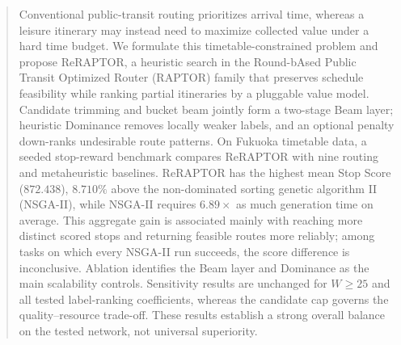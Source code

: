 \author{Bin Zhou \and
    Guangxian Li \and
    Teruki Ogo \and
    Yutaka Arakawa \and
    Tsunenori Mine %
}



\date{Received: date / Accepted: date}


\maketitle

\begin{abstract}
    Conventional public-transit routing prioritizes arrival time, whereas a
    leisure itinerary may instead need to maximize collected value under a hard
    time budget. We formulate this timetable-constrained problem and propose
    ReRAPTOR, a heuristic search in the Round-bAsed Public Transit Optimized
    Router (RAPTOR) family that preserves schedule
    feasibility while ranking partial itineraries by a pluggable value model.
    Candidate trimming and bucket beam jointly form a two-stage Beam layer;
    heuristic Dominance removes locally weaker labels, and an optional penalty
    down-ranks undesirable route patterns. On Fukuoka timetable data, a seeded
    stop-reward benchmark
    compares ReRAPTOR with nine routing and metaheuristic baselines. ReRAPTOR has
    the highest mean Stop Score (\(872.438\)), \(8.710\%\) above the
    non-dominated sorting genetic algorithm II (NSGA-II), while
    NSGA-II requires \(6.89\times\) as much generation time on average. This
    aggregate gain is associated mainly
    with reaching more distinct scored stops and returning feasible routes more
    reliably; among tasks on which every NSGA-II run succeeds, the score
    difference is inconclusive. Ablation identifies the Beam layer and Dominance as the
    main scalability controls. Sensitivity results are unchanged for
    \(W\geq25\) and all tested label-ranking coefficients, whereas the candidate
    cap governs the quality--resource trade-off. These results establish a
    strong overall balance on the tested network, not universal superiority.
\end{abstract}

